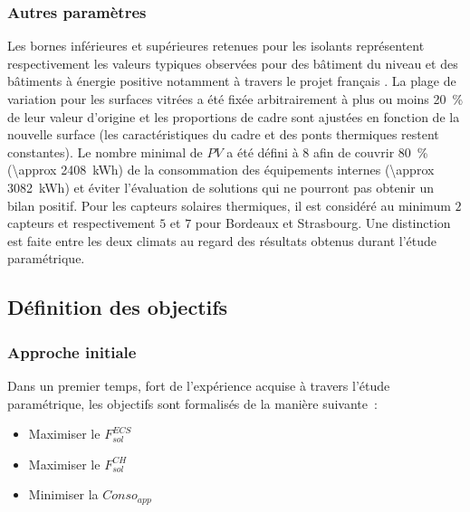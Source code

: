 \subsubsection{Autres paramètres} %
\label{ssub:autres_parametres}
Les bornes inférieures et supérieures retenues pour les isolants représentent respectivement les valeurs typiques observées
pour des bâtiment du niveau  et des bâtiments à énergie positive notamment à
travers le projet français .
La plage de variation pour les surfaces vitrées a été fixée arbitrairement à plus ou moins
\SI{20}{\percent} de leur valeur d’origine et les proportions de cadre sont ajustées
en fonction de la nouvelle surface (les caractéristiques du cadre et des ponts thermiques
restent constantes).
Le nombre minimal de $PV$ a été défini à $8$ afin de couvrir \SI{80}{\percent} (\SI{\approx
2408}{\kWh}) de la consommation des équipements internes (\SI{\approx 3082}{\kWh}) et éviter
l’évaluation de solutions qui ne pourront pas obtenir un bilan positif.
Pour les capteurs solaires thermiques, il est considéré au minimum $2$ capteurs et respectivement
$5$ et $7$ pour Bordeaux et Strasbourg. Une distinction est faite entre les deux climats
au regard des résultats obtenus durant l’étude paramétrique.



\subsection{Définition des objectifs} %
\label{sub:definition_des_objectifs}
\subsubsection{Approche initiale} %
\label{ssub:approche_initiale}
\noindent Dans un premier temps, fort de l’expérience acquise à travers l’étude paramétrique,
les objectifs sont formalisés de la manière suivante~:
\begin{itemize}
  \item Maximiser le $F_{sol}^{ECS}$
  \item Maximiser le $F_{sol}^{CH}$
  \item Minimiser la $Conso_{app}$
\end{itemize}

